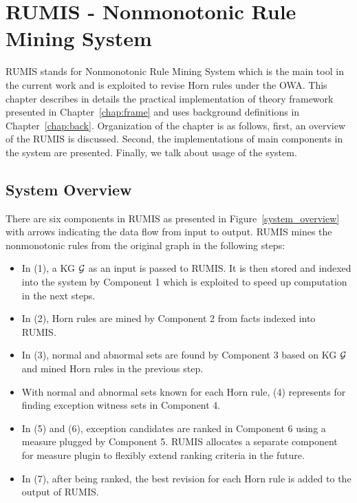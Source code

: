 \chapter{RUMIS - Nonmonotonic Rule Mining System}\label{chap:system}

RUMIS stands for Nonmonotonic Rule Mining System which is the main tool in the current work and is exploited to revise Horn rules under the OWA. This chapter describes in details the practical implementation of theory framework presented in Chapter~\ref{chap:frame} and uses background definitions in Chapter~\ref{chap:back}. Organization of the chapter is as follows, first, an overview of the RUMIS is discussed. Second, the implementations of main components in the system are presented. Finally, we talk about usage of the system.

\section{System Overview}
\label{sec:overview}

There are six components in RUMIS as presented in Figure~\ref{system_overview} with arrows indicating the data flow from input to output. RUMIS mines the nonmonotonic rules from the original graph in the following steps:

\begin{itemize}
\item In (1), a KG $\mathcal{G}$ as an input is passed to RUMIS. It is then stored and indexed into the system by Component 1 which is exploited to speed up computation in the next steps.
\item In (2), Horn rules are mined by Component 2 from facts indexed into RUMIS.
\item In (3), normal and abnormal sets are found by Component 3 based on KG $\mathcal{G}$ and mined Horn rules in the previous step.
\item With normal and abnormal sets known for each Horn rule, (4) represents for finding exception witness sets in Component 4.
\item In (5) and (6), exception candidates are ranked in Component 6 using a measure plugged by Component 5. RUMIS allocates a separate component for measure plugin to flexibly extend ranking criteria in the future.
\item In (7), after being ranked, the best revision for each Horn rule is added to the output of RUMIS.
\end{itemize}

